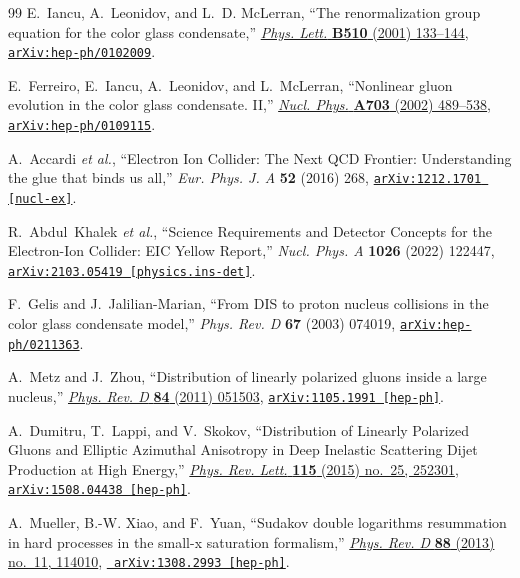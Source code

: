 \begin{thebibliography}{99}
E.~Iancu, A.~Leonidov, and L.~D. McLerran, ``{The renormalization group
  equation for the color glass condensate},''
  \href{http://dx.doi.org/10.1016/S0370-2693(01)00524-X}{{\em Phys. Lett.} {\bf
  B510} (2001)  133--144},
\href{http://arxiv.org/abs/hep-ph/0102009}{{\tt arXiv:hep-ph/0102009}}.

E.~Ferreiro, E.~Iancu, A.~Leonidov, and L.~McLerran, ``{Nonlinear gluon
  evolution in the color glass condensate. II},''
  \href{http://dx.doi.org/10.1016/S0375-9474(01)01329-X}{{\em Nucl. Phys.} {\bf
  A703} (2002)  489--538},
\href{http://arxiv.org/abs/hep-ph/0109115}{{\tt arXiv:hep-ph/0109115}}.

A.~Accardi {\em et al.}, ``{Electron Ion Collider: The Next QCD Frontier: Understanding the glue that binds us all},'' {\em Eur. Phys. J. A} {\bf 52} (2016) 268, \href{http://arxiv.org/abs/1212.1701}{{\tt arXiv:1212.1701 [nucl-ex]}}.

R.~Abdul~Khalek {\em et al.}, ``{Science Requirements and Detector Concepts for the Electron-Ion Collider: EIC Yellow Report},'' {\em Nucl. Phys. A} {\bf 1026} (2022) 122447, \href{http://arxiv.org/abs/2103.05419}{{\tt arXiv:2103.05419 [physics.ins-det]}}.

F.~Gelis and J.~Jalilian-Marian, ``{From DIS to proton nucleus collisions in the color glass condensate model},'' {\em Phys. Rev. D} {\bf 67} (2003) 074019, \href{http://arxiv.org/abs/hep-ph/0211363}{{\tt arXiv:hep-ph/0211363}}.

A.~Metz and J.~Zhou, ``{Distribution of linearly polarized gluons inside a
  large nucleus},'' \href{http://dx.doi.org/10.1103/PhysRevD.84.051503}{{\em
  Phys. Rev. D} {\bf 84} (2011)  051503},
  \href{http://arxiv.org/abs/1105.1991}{{\tt arXiv:1105.1991 [hep-ph]}}.

A.~Dumitru, T.~Lappi, and V.~Skokov, ``{Distribution of Linearly Polarized
  Gluons and Elliptic Azimuthal Anisotropy in Deep Inelastic Scattering Dijet
  Production at High Energy},''
  \href{http://dx.doi.org/10.1103/PhysRevLett.115.252301}{{\em Phys. Rev.
  Lett.} {\bf 115} (2015) no.~25, 252301},
  \href{http://arxiv.org/abs/1508.04438}{{\tt arXiv:1508.04438 [hep-ph]}}.

A.~Mueller, B.-W. Xiao, and F.~Yuan, ``{Sudakov double logarithms resummation
  in hard processes in the small-x saturation formalism},''
  \href{http://dx.doi.org/10.1103/PhysRevD.88.114010}{{\em Phys. Rev. D} {\bf
  88} (2013) no.~11, 114010}, \href{http://arxiv.org/abs/1308.2993}{{\tt
  arXiv:1308.2993 [hep-ph]}}.


\end{thebibliography}
